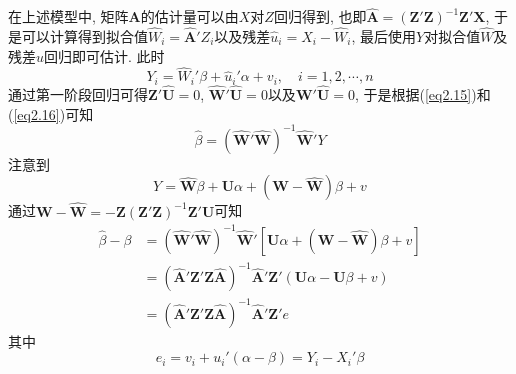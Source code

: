 \documentclass[cn, 12pt, math=mtpro2, bibstyle=apa, blue, twocol]{elegantbook}
\newcommand{\X}{\mathbold{X}}
\newcommand{\Z}{\mathbold{Z}}
\newcommand{\hb}{\hat{\beta}}
\newcommand{\A}{\mathbold{A}}
\begin{document}
在上述模型中, 矩阵$\A$的估计量可以由$X$对$Z$回归得到, 也即$\hat{\A}=(\Z'\Z)^{-1}\Z'\X$, 于是可以计算得到拟合值$\hat{W}_i=\hat{\A}'Z_i$以及残差$\hat{u}_i=X_i-\hat{W}_i$, 最后使用$Y$对拟合值$\hat{W}$及残差$\hat{u}$回归即可估计. 此时
$$Y_i=\hat{W}_i'\beta+\hat{u}_i'\alpha+v_i,\quad i=1,2,\cdots,n$$
通过第一阶段回归可得$\Z'\hat{\mathbold{U}}=0$, $\hat{\mathbold{W}}'\hat{\mathbold{U}}=0$以及$\mathbold{W}'\hat{\mathbold{U}}=0$, 于是根据(\ref{eq2.15})和(\ref{eq2.16})可知
$$\hb=(\hat{\mathbold{W}}'\hat{\mathbold{W}})^{-1}\hat{\mathbold{W}}'Y$$
注意到
$$Y=\hat{\mathbold{W}}\beta+\mathbold{U}\alpha+(\mathbold{W}-\hat{\mathbold{W}})\beta+v$$
通过$\mathbold{W}-\hat{\mathbold{W}}=-\Z(\Z'\Z)^{-1}\Z'\mathbold{U}$可知
\begin{align*}
\hb-\beta&=(\hat{\mathbold{W}}'\hat{\mathbold{W}})^{-1}\hat{\mathbold{W}}'[\mathbold{U}\alpha+(\mathbold{W}-\hat{\mathbold{W}})\beta+v] \\
&=(\hat{\A}'\Z'\Z\hat{\A})^{-1}\hat{\A}'\Z'(\mathbold{U}\alpha-\mathbold{U}\beta+v) \\
&=(\hat{\A}'\Z'\Z\hat{\A})^{-1}\hat{\A}'\Z'e
\end{align*}
其中
$$e_i=v_i+u_i'(\alpha-\beta)=Y_i-X_i'\beta$$
\end{document}
